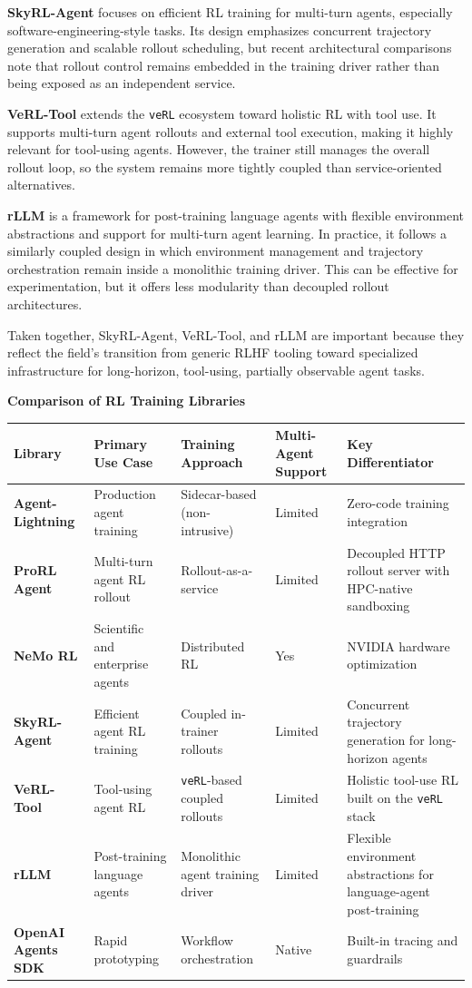 \textbf{SkyRL-Agent} focuses on efficient RL training for multi-turn agents, especially software-engineering-style tasks. Its design emphasizes concurrent trajectory generation and scalable rollout scheduling, but recent architectural comparisons note that rollout control remains embedded in the training driver rather than being exposed as an independent service.

\textbf{VeRL-Tool} extends the \texttt{veRL} ecosystem toward holistic RL with tool use. It supports multi-turn agent rollouts and external tool execution, making it highly relevant for tool-using agents. However, the trainer still manages the overall rollout loop, so the system remains more tightly coupled than service-oriented alternatives.

\textbf{rLLM} is a framework for post-training language agents with flexible environment abstractions and support for multi-turn agent learning. In practice, it follows a similarly coupled design in which environment management and trajectory orchestration remain inside a monolithic training driver. This can be effective for experimentation, but it offers less modularity than decoupled rollout architectures.

Taken together, SkyRL-Agent, VeRL-Tool, and rLLM are important because they reflect the field's transition from generic RLHF tooling toward specialized infrastructure for long-horizon, tool-using, partially observable agent tasks.

\textbf{Comparison of RL Training Libraries}

\begin{table}[tbp]
\centering
\footnotesize
\begin{tabularx}{\textwidth}{YYYYY}
\toprule
\textbf{Library} & \textbf{Primary Use Case} & \textbf{Training Approach} & \textbf{Multi-Agent Support} & \textbf{Key Differentiator} \\
\midrule
\textbf{Agent-Lightning} & Production agent training & Sidecar-based (non-intrusive) & Limited & Zero-code training integration \\
\textbf{ProRL Agent} & Multi-turn agent RL rollout & Rollout-as-a-service & Limited & Decoupled HTTP rollout server with HPC-native sandboxing \\
\textbf{NeMo RL} & Scientific and enterprise agents & Distributed RL & Yes & NVIDIA hardware optimization \\
\textbf{SkyRL-Agent} & Efficient agent RL training & Coupled in-trainer rollouts & Limited & Concurrent trajectory generation for long-horizon agents \\
\textbf{VeRL-Tool} & Tool-using agent RL & \texttt{veRL}-based coupled rollouts & Limited & Holistic tool-use RL built on the \texttt{veRL} stack \\
\textbf{rLLM} & Post-training language agents & Monolithic agent training driver & Limited & Flexible environment abstractions for language-agent post-training \\
\textbf{OpenAI Agents SDK} & Rapid prototyping & Workflow orchestration & Native & Built-in tracing and guardrails \\
\bottomrule
\end{tabularx}
\end{table}

